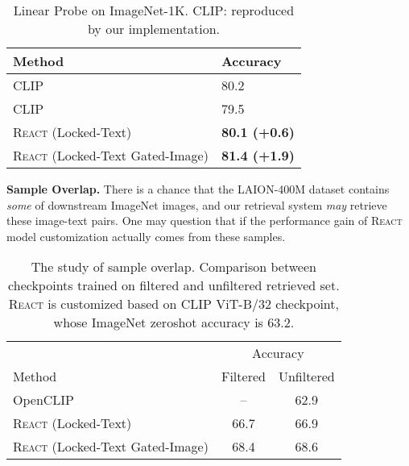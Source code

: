 \documentclass[10pt,twocolumn,letterpaper]{article}
\renewcommand{\paragraph}[1]{\vspace{1.25mm}\noindent\textbf{#1}}
\newcommand{\shortname}{\textsc{React}}
\begin{document}
\begin{table}[t]
    \centering
    \footnotesize
    \begin{tabular}{l|l}
        \toprule
        Method & Accuracy \\
        \midrule
        CLIP~\cite{radford2021learning} & 80.2 \\
        \midrule
        CLIP & 79.5 \\
        \rowcolor{Gray} \shortname{} (Locked-Text) & {\bf 80.1 \textcolor{emerald!80}{(+0.6)}} \\
        \rowcolor{Gray} \shortname{} (Locked-Text Gated-Image) & {\bf 81.4 \textcolor{emerald!80}{(+1.9)}} \\
        \bottomrule
    \end{tabular}
    \caption{Linear Probe on ImageNet-1K. CLIP: reproduced by our implementation.
    }
    \label{tab:linear_probe_in1k}
\end{table}


\paragraph{Sample Overlap.}
There is a chance that the LAION-400M dataset contains \emph{some} of downstream ImageNet images, and our retrieval system \emph{may} retrieve these image-text pairs.  One may question that if the performance gain of \shortname{} model customization actually comes from these samples.

\begin{table}[t]
    \centering
    \footnotesize
    \begin{tabular}{l|cc}
        \toprule
        & \multicolumn{2}{c}{Accuracy} \\
        Method & Filtered & Unfiltered \\
        \midrule
        OpenCLIP~\cite{openclip} & -- & 62.9 \\
        \midrule
        \rowcolor{Gray} \shortname{} (Locked-Text) & 66.7 & 66.9 \\
        \rowcolor{Gray} \shortname{} (Locked-Text Gated-Image) & 68.4 & 68.6 \\
        \bottomrule
    \end{tabular}
    \caption{The study of sample overlap. Comparison between checkpoints trained on filtered and unfiltered retrieved set.  \shortname{} is customized based on CLIP ViT-B/32 checkpoint, whose ImageNet zeroshot accuracy is 63.2.
    \label{tab:compare_filter}
    }
\end{table}
\end{document}

